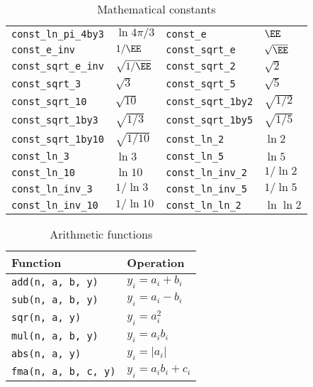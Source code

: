 \begin{table}
\begin{tabularx}{\textwidth}{p{1.2in}Lp{1.2in}L}
    \verb|const_ln_pi_4by3|   & $\ln{4\pi/3}$   &
    \verb|const_e|            & $\EE$           \\
    \verb|const_e_inv|        & $1/\EE$         &
    \verb|const_sqrt_e|       & $\sqrt{\EE}$    \\
    \verb|const_sqrt_e_inv|   & $\sqrt{1/\EE}$  &
    \verb|const_sqrt_2|       & $\sqrt{2}$      \\
    \verb|const_sqrt_3|       & $\sqrt{3}$      &
    \verb|const_sqrt_5|       & $\sqrt{5}$      \\
    \verb|const_sqrt_10|      & $\sqrt{10}$     &
    \verb|const_sqrt_1by2|    & $\sqrt{1/2}$    \\
    \verb|const_sqrt_1by3|    & $\sqrt{1/3}$    &
    \verb|const_sqrt_1by5|    & $\sqrt{1/5}$    \\
    \verb|const_sqrt_1by10|   & $\sqrt{1/10}$   &
    \verb|const_ln_2|         & $\ln{2}$        \\
    \verb|const_ln_3|         & $\ln{3}$        &
    \verb|const_ln_5|         & $\ln{5}$        \\
    \verb|const_ln_10|        & $\ln{10}$       &
    \verb|const_ln_inv_2|     & $1/\ln{2}$      \\
    \verb|const_ln_inv_3|     & $1/\ln{3}$      &
    \verb|const_ln_inv_5|     & $1/\ln{5}$      \\
    \verb|const_ln_inv_10|    & $1/\ln{10}$     &
    \verb|const_ln_ln_2|      & $\ln\ln{2}$     \\
    \bottomrule
  \end{tabularx}
  \caption{Mathematical constants}
  \label{tab:Mathematical constants}
\end{table}

\begin{table}
  \begin{tabularx}{\textwidth}{LL}
    \toprule
    Function & Operation \\
    \midrule
    \verb|add(n, a, b, y)|    & $y_i = a_i + b_i$     \\
    \verb|sub(n, a, b, y)|    & $y_i = a_i - b_i$     \\
    \verb|sqr(n, a, y)|       & $y_i = a_i^2$         \\
    \verb|mul(n, a, b, y)|    & $y_i = a_i b_i$       \\
    \verb|abs(n, a, y)|       & $y_i = |a_i|$         \\
    \verb|fma(n, a, b, c, y)| & $y_i = a_i b_i + c_i$ \\
    \bottomrule
  \end{tabularx}
  \caption{Arithmetic functions}
  \label{tab:Arithmetic functions}
\end{table}

